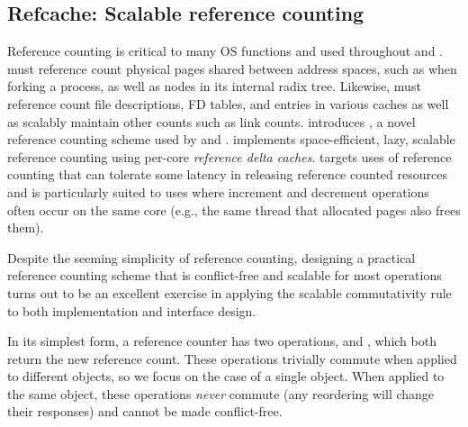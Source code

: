\subsection{Refcache: Scalable reference counting}
\label{sec:sv6:refcache}

Reference counting is critical to many OS functions and used
throughout \vm and \fs.  \vm must reference count physical pages
shared between address spaces, such as when forking a process, as well
as nodes in its internal radix tree.  Likewise, \fs must reference
count file descriptions, FD tables, and entries in various caches as
well as scalably maintain other counts such as link counts.
%
 introduces , a novel reference
counting scheme
used by \vm and \fs.   implements space-efficient, lazy,
scalable reference counting using per-core \emph{reference delta
  caches}.   targets uses of reference counting that can
tolerate some latency in releasing reference counted resources and is
particularly suited to uses where increment and decrement operations
often occur on the same core (e.g., the same thread that allocated
pages also frees them).


Despite the seeming simplicity of reference counting, designing a
practical reference counting scheme that is conflict-free and scalable
for most operations turns out to be an excellent exercise in applying
the scalable commutativity rule to both implementation and interface
design.

In its simplest form, a reference counter has two operations,
 and , which both return the new
reference count.  These operations trivially commute when applied to
different objects, so we focus on the case of a single object.  When
applied to the same object, these operations \emph{never} commute (any
reordering will change their responses) and cannot be made
conflict-free.


